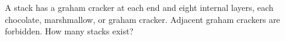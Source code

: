 A stack has a graham cracker at each end and eight internal layers, each chocolate, marshmallow, or graham cracker. Adjacent graham crackers are forbidden. How many stacks exist?
